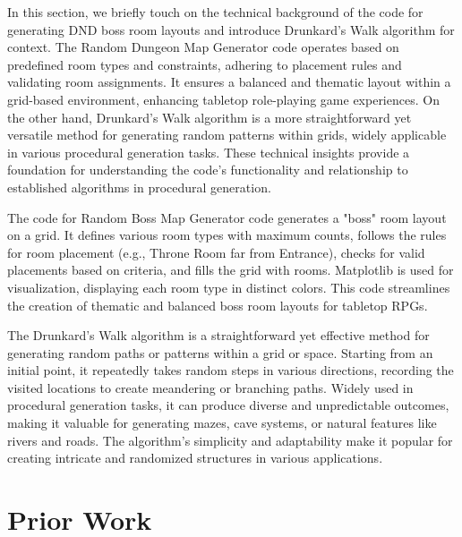 \documentclass[10pt,twocolumn]{article}
\begin{document}
In this section, we briefly touch on the technical background of the code for generating DND boss room layouts and introduce Drunkard's Walk algorithm for context. The Random Dungeon Map Generator code operates based on predefined room types and constraints, adhering to placement rules and validating room assignments. It ensures a balanced and thematic layout within a grid-based environment, enhancing tabletop role-playing game experiences. On the other hand, Drunkard's Walk algorithm is a more straightforward yet versatile method for generating random patterns within grids, widely applicable in various procedural generation tasks. These technical insights provide a foundation for understanding the code's functionality and relationship to established algorithms in procedural generation.
 
The code for Random Boss Map Generator code generates a "boss" room layout on a grid. It defines various room types with maximum counts, follows the rules for room placement (e.g., Throne Room far from Entrance), checks for valid placements based on criteria, and fills the grid with rooms. Matplotlib is used for visualization, displaying each room type in distinct colors. This code streamlines the creation of thematic and balanced boss room layouts for tabletop RPGs.

The Drunkard's Walk algorithm is a straightforward yet effective method for generating random paths or patterns within a grid or space. Starting from an initial point, it repeatedly takes random steps in various directions, recording the visited locations to create meandering or branching paths. Widely used in procedural generation tasks, it can produce diverse and unpredictable outcomes, making it valuable for generating mazes, cave systems, or natural features like rivers and roads. The algorithm's simplicity and adaptability make it popular for creating intricate and randomized structures in various applications.


\section{Prior Work}
\end{document}
